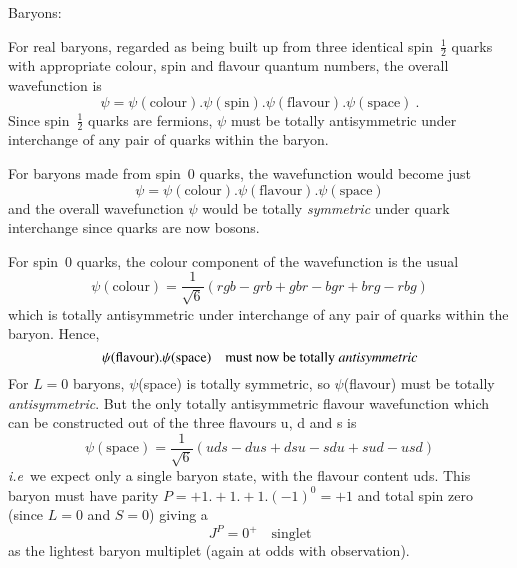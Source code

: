 \begin{allparts}
Baryons:

For real baryons, regarded as being
built up from three identical spin~$\frac 1 2$ quarks
with appropriate colour, spin and flavour quantum numbers,
the overall wavefunction is
\[  \psi = \psi(\text{colour}).\psi(\text{spin}).
           \psi(\text{flavour}).\psi(\text{space}) ~. \]
Since spin~$\frac 1 2$ quarks are fermions,
$\psi$ must be totally antisymmetric under interchange of any
pair of quarks within the baryon.

For baryons made from spin~0 quarks, the wavefunction would become just
\[  \psi = \psi(\text{colour}).
           \psi(\text{flavour}).\psi(\text{space})  \]
and the overall wavefunction $\psi$ would be totally {\em symmetric}
under quark interchange since quarks are now bosons.

For spin~0 quarks, the colour component of the wavefunction is the usual
\[  \psi(\text{colour}) =
     \frac{1}{\sqrt{6}}(rgb - grb + gbr - bgr + brg - rbg)  \]
which is totally antisymmetric under interchange of any pair of
quarks within the baryon.
Hence,
\[  \psi(\text{flavour}).\psi(\text{space})
          \quad \text{must now be totally {\em antisymmetric}}  \]
For $L=0$ baryons, $\psi$(space) is totally symmetric,
so $\psi$(flavour) must be totally {\em antisymmetric}.
But the only totally antisymmetric flavour wavefunction which can be
constructed out of the three flavours u, d and s is
\[  \psi(\text{space}) =
      \frac{1}{\sqrt{6}} (uds - dus + dsu - sdu + sud - usd)  \]
{\textit{i.e}}~we expect only a single baryon state, with the flavour content uds.
This baryon must have parity $P=+1.+1.+1.(-1)^0=+1$ and total spin zero
(since $L=0$ and $S=0$)
giving a
\begin{equation*}
   \boxed{
   J^P = 0^+ \quad \text{singlet}
   }
\end{equation*}
as the lightest baryon multiplet (again at odds with observation).

\endanswer


\end{allparts}
